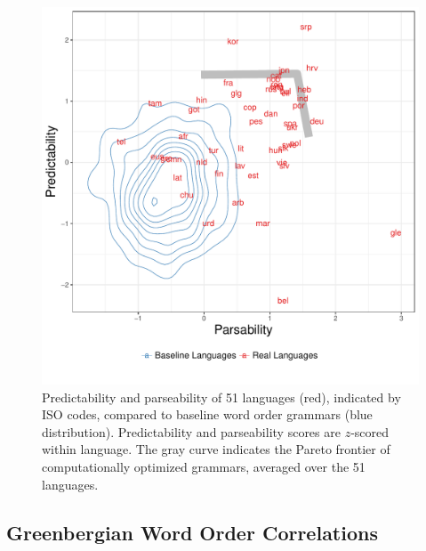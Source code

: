 \documentclass[9pt,twocolumn,twoside,lineno]{pnas-new}
\begin{document}
\begin{figure}
    \centering
    \includegraphics[scale=.45]{../results/plane/pareto-plane-iso-best-balanced-legend-viz.pdf}
    \caption{Predictability and parseability of 51 languages (red), indicated by ISO codes, compared to baseline word order grammars (blue distribution). Predictability and parseability scores are $z$-scored within language. The gray curve indicates the Pareto frontier of computationally optimized grammars, averaged over the 51 languages.} %
    \label{fig:pareto-plane}
\end{figure}


\subsection{Greenbergian Word Order Correlations}
\label{sec:greenberg}
\end{document}
